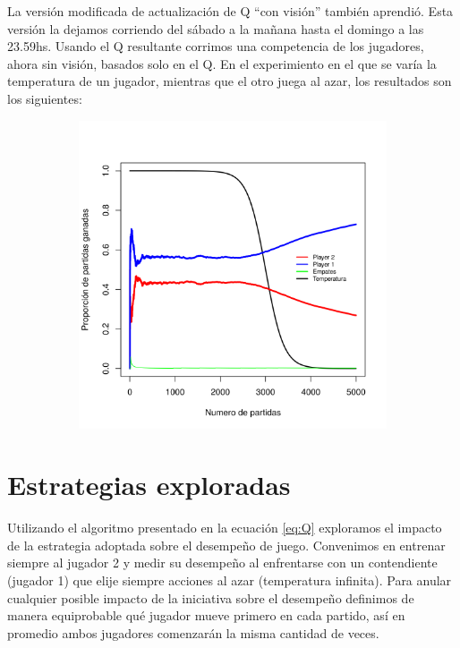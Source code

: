 \documentclass[11pt, spanish]{article}
\begin{document}
\par La versión modificada de actualización de Q ``con visión'' también aprendió. Esta versión la dejamos corriendo del sábado a la mañana hasta el domingo a las 23.59hs. Usando el Q resultante corrimos una competencia de los jugadores, ahora sin visión, basados solo en el Q. En el experimiento en el que se varía la temperatura de un jugador, mientras que el otro juega al azar, los resultados son los siguientes:

\begin{figure}[H]
    \centering
    \begin{subfigure}[b]{0.45\textwidth}
      \includegraphics[width=\textwidth]{Imagenes/SinVision_disipacion_QconVison}
    \end{subfigure}
\end{figure}


\section{Estrategias exploradas}
\par Utilizando el algoritmo presentado en la ecuación \ref{eq:Q} exploramos 
el impacto de la estrategia adoptada sobre el desempeño de juego. Convenimos en 
entrenar siempre al jugador 2 y medir su desempeño al enfrentarse con un 
contendiente (jugador 1) que elije siempre acciones al azar (temperatura 
infinita). Para anular cualquier posible impacto de la iniciativa sobre el 
desempeño definimos de manera equiprobable qué jugador mueve primero en cada 
partido, así en promedio ambos jugadores comenzarán la misma cantidad de veces.
\end{document}
